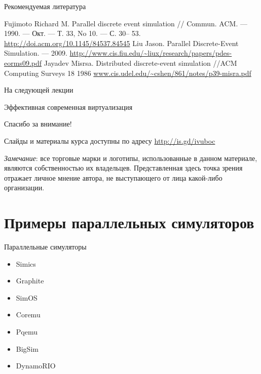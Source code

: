 \documentclass{beamer}
\begin{document}


% 

\begin{frame}[allowframebreaks]{Рекомендуемая литература}
\begin{thebibliography}{99}
 Fujimoto Richard M. Parallel discrete event simulation // Commun. ACM. — 1990. — Окт. — Т. 33, No 10. — С. 30– 53. \url{http://doi.acm.org/10.1145/84537.84545}
 Liu Jason. Parallel Discrete-Event Simulation. — 2009. \url{http://www.cis.fiu.edu/~liux/research/papers/pdes-eorms09.pdf}
Jayadev Misrsa. Distributed discrete-event simulation //ACM Computing Surveys 18 1986 \url{www.cis.udel.edu/~cshen/861/notes/p39-misra.pdf}


\end{thebibliography}
\end{frame}


\begin{frame}{На следующей лекции}
\centering

Эффективная современная виртуализация

\end{frame}


\begin{frame}

{\huge{Спасибо за внимание!}\par}

\vfill

Слайды и материалы курса доступны по адресу \url{http://is.gd/ivuboc} %

\vfill

\tiny{\textit{Замечание}: все торговые марки и логотипы, использованные в данном материале, являются собственностью их владельцев. Представленная здесь точка зрения отражает личное мнение автора, не выступающего от лица какой-либо организации.}

\end{frame}

\section{Примеры параллельных симуляторов}

\begin{frame}{Параллельные симуляторы}
\begin{itemize}
    \item Simics
    \item Graphite
    \item SimOS
    \item Coremu
    \item Pqemu
    \item BigSim
    \item DynamoRIO
\end{itemize}
\end{frame}
\end{document}
